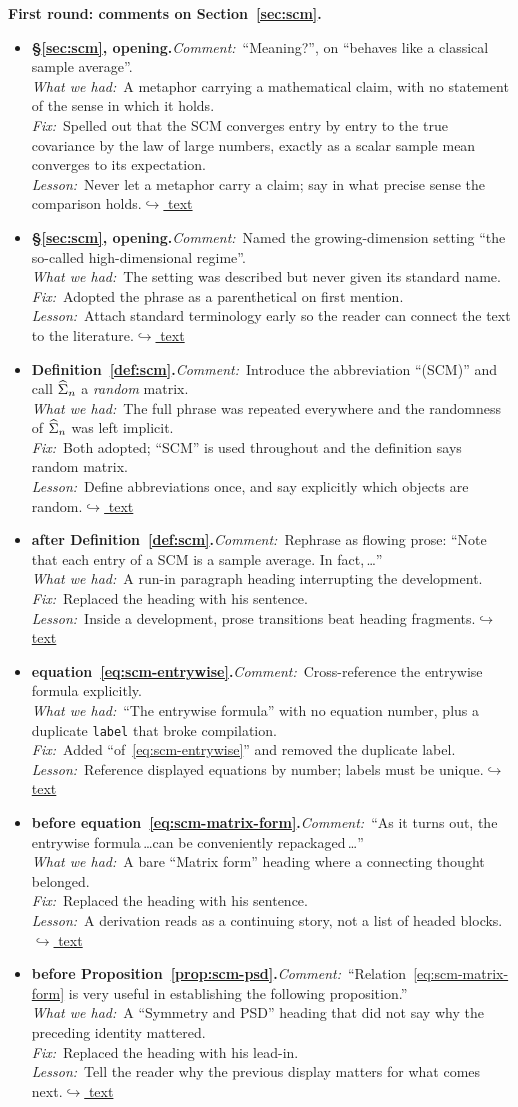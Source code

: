 \documentclass[12pt]{article}
\newcommand{\gdlogentry}[6]{%
  \item[\textcolor{thesisRev}{$\star$\,\ref{gdrev:#1}}]\hypertarget{gdlog:#1}{}%
  \textbf{#2.}\enspace\emph{Comment:}~#3\\
  \emph{What we had:}~#4\\
  \emph{Fix:}~#5\\
  \emph{Lesson:}~#6\enspace\hyperlink{gdtext:#1}{\textcolor{thesisLink}{$\hookrightarrow$ text}}}
\begin{document}
\medskip
\noindent\textbf{First round: comments on Section~\ref{sec:scm}.}
\begin{itemize}[leftmargin=2.4em,itemsep=0.55em]
\gdlogentry{meaning}{\S\ref{sec:scm}, opening}{``Meaning?'', on ``behaves like a classical sample average''.}{A metaphor carrying a mathematical claim, with no statement of the sense in which it holds.}{Spelled out that the SCM converges entry by entry to the true covariance by the law of large numbers, exactly as a scalar sample mean converges to its expectation.}{Never let a metaphor carry a claim; say in what precise sense the comparison holds.}

\gdlogentry{hdr-name}{\S\ref{sec:scm}, opening}{Named the growing-dimension setting ``the so-called high-dimensional regime''.}{The setting was described but never given its standard name.}{Adopted the phrase as a parenthetical on first mention.}{Attach standard terminology early so the reader can connect the text to the literature.}

\gdlogentry{scm-abbr}{Definition~\ref{def:scm}}{Introduce the abbreviation ``(SCM)'' and call \(\widehat{\Sigma}_n\) a \emph{random} matrix.}{The full phrase was repeated everywhere and the randomness of \(\widehat{\Sigma}_n\) was left implicit.}{Both adopted; ``SCM'' is used throughout and the definition says random matrix.}{Define abbreviations once, and say explicitly which objects are random.}

\gdlogentry{each-entry}{after Definition~\ref{def:scm}}{Rephrase as flowing prose: ``Note that each entry of a SCM is a sample average. In fact,\,\dots''}{A run-in paragraph heading interrupting the development.}{Replaced the heading with his sentence.}{Inside a development, prose transitions beat heading fragments.}

\gdlogentry{eqref}{equation~\eqref{eq:scm-entrywise}}{Cross-reference the entrywise formula explicitly.}{``The entrywise formula'' with no equation number, plus a duplicate \texttt{label} that broke compilation.}{Added ``of~\eqref{eq:scm-entrywise}'' and removed the duplicate label.}{Reference displayed equations by number; labels must be unique.}

\gdlogentry{matrix-form}{before equation~\eqref{eq:scm-matrix-form}}{``As it turns out, the entrywise formula\,\dots can be conveniently repackaged\,\dots''}{A bare ``Matrix form'' heading where a connecting thought belonged.}{Replaced the heading with his sentence.}{A derivation reads as a continuing story, not a list of headed blocks.}

\gdlogentry{psd-leadin}{before Proposition~\ref{prop:scm-psd}}{``Relation~\eqref{eq:scm-matrix-form} is very useful in establishing the following proposition.''}{A ``Symmetry and PSD'' heading that did not say why the preceding identity mattered.}{Replaced the heading with his lead-in.}{Tell the reader why the previous display matters for what comes next.}


\end{itemize}
\end{document}
